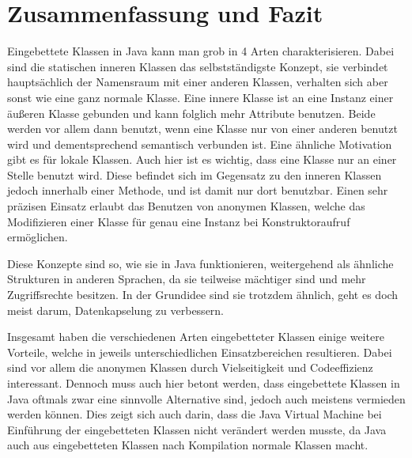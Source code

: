 \chapter{Zusammenfassung und Fazit}

Eingebettete Klassen in Java kann man grob in 4 Arten charakterisieren.
Dabei sind die statischen inneren Klassen das selbstständigste Konzept, sie verbindet hauptsächlich der Namensraum mit einer anderen Klassen, verhalten sich aber sonst wie eine ganz normale Klasse.
Eine innere Klasse ist an eine Instanz einer äußeren Klasse gebunden und kann folglich mehr Attribute benutzen.
Beide werden vor allem dann benutzt, wenn eine Klasse nur von einer anderen benutzt wird und dementsprechend semantisch verbunden ist.
Eine ähnliche Motivation gibt es für lokale Klassen. Auch hier ist es wichtig, dass eine Klasse nur an einer Stelle benutzt wird.
Diese befindet sich im Gegensatz zu den inneren Klassen jedoch innerhalb einer Methode, und ist damit nur dort benutzbar.
Einen sehr präzisen Einsatz erlaubt das Benutzen von anonymen Klassen, welche das Modifizieren einer Klasse für genau eine Instanz bei Konstruktoraufruf ermöglichen.

Diese Konzepte sind so, wie sie in Java funktionieren, weitergehend als ähnliche Strukturen in anderen Sprachen, da sie teilweise mächtiger sind und mehr Zugriffsrechte besitzen.
In der Grundidee sind sie trotzdem ähnlich, geht es doch meist darum, Datenkapselung zu verbessern.

Insgesamt haben die verschiedenen Arten eingebetteter Klassen einige weitere Vorteile, welche in jeweils unterschiedlichen Einsatzbereichen resultieren.
Dabei sind vor allem die anonymen Klassen durch Vielseitigkeit und Codeeffizienz interessant.
Dennoch muss auch hier betont werden, dass eingebettete Klassen in Java oftmals zwar eine sinnvolle Alternative sind, jedoch auch meistens vermieden werden können.
Dies zeigt sich auch darin, dass die Java Virtual Machine bei Einführung der eingebetteten Klassen nicht verändert werden musste, da Java auch aus eingebetteten Klassen nach Kompilation normale Klassen macht.

\newpage
